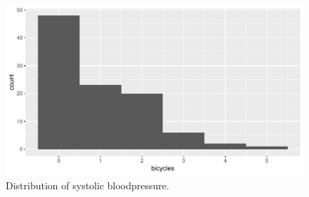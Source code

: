 \documentclass[]{report}\usepackage[]{graphicx}\usepackage[]{color}
\makeatletter
\def\maxwidth{ %
  \ifdim\Gin@nat@width>\linewidth
    \linewidth
  \else
    \Gin@nat@width
  \fi
}
\makeatother
\begin{document}
\begin{enumerate}
\begin{figure}
{\centering \includegraphics[width=\maxwidth]{figure/mode2-1} 

}

\caption[Distribution of systolic bloodpressure]{Distribution of systolic bloodpressure.}\label{fig:mode2}
\end{figure}





\end{enumerate}
\end{document}
